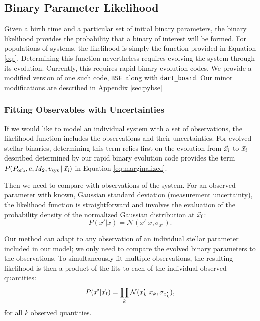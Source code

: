 \documentclass[usenatbib]{mnras}
\newcommand{\given}{\,|\,}
\newcommand{\bse}{{\tt BSE}}
\newcommand{\dart}{{\tt dart\_board}}
\begin{document}
\subsection{Binary Parameter Likelihood} \label{sec:likelihoods}

Given a birth time and a particular set of initial binary parameters, the binary likelihood provides the probability that a binary of interest will be formed. For populations of systems, the likelihood is simply the function provided in Equation \ref{eq:}. Determining this function nevertheless requires evolving the system through its evolution. Currently, this requires rapid binary evolution codes. We provide a modified version of one such code, \bse\ along with \dart. Our minor modifications are described in Appendix \ref{sec:pybse}

\subsubsection{Fitting Observables with Uncertainties}

If we would like to model an individual system with a set of observations, the likelihood function includes the observations and their uncertainties. For evolved stellar binaries, determining this term relies first on the evolution from $\vec{x}_{\rm i}$ to $\vec{x}_{\rm f}$ described determined by our rapid binary evolution code provides the term $P(P_{\rm orb}, e, M_2, v_{\rm sys} \given \vec{x}_{\rm i})$ in Equation \ref{eq:marginalized}. 

Then we need to compare with observations of the system. For an observed parameter with known, Gaussian standard deviation (measurement uncertainty), the likelihood function is straightforward and involves the evaluation of the probability density of the normalized Gaussian distribution at $\vec{x}_{\rm f}$:
\begin{equation}
P(x'|x) = \mathcal{N}(x' | x, \sigma_{x'}).
\end{equation}

Our method can adapt to any observation of an individual stellar parameter included in our model; we only need to compare the evolved binary parameters to the observations. To simultaneously fit multiple observations, the resulting likelihood is then a product of the fits to each of the individual observed quantities:
\begin{equation}
P(\vec{x}' | \vec{x}_{\rm f}) = \prod_k \mathcal{N}(x'_k | x_k, \sigma_{x'_k}),
\end{equation}
for all $k$ observed quantities.
\end{document}
